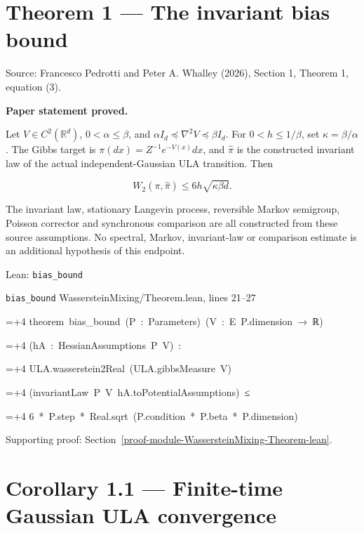 \documentclass[11pt,a4paper]{report}
\newlength{\leancharwidth}
\newenvironment{leancode}{\par\smallskip\begingroup\ttfamily\footnotesize\raggedright
  \settowidth{\leancharwidth}{M}\setlength{\parskip}{0pt}\setlength{\parindent}{0pt}
  \frenchspacing}{\par\endgroup\smallskip}
\newcommand{\leanline}[2]{\hangindent=\dimexpr#1\leancharwidth+4\leancharwidth\relax
  \hangafter=1\noindent\hspace*{#1\leancharwidth}#2\par}
\newcommand{\leansource}[1]{\par{\footnotesize\color{leanmuted}#1}\par}
\begin{document}
\section{\texorpdfstring{Theorem 1 — The invariant bias bound}{Theorem 1 — The invariant bias bound}}


Source: Francesco Pedrotti and Peter A. Whalley (2026), Section 1, Theorem 1, equation (3).



\textbf{Paper statement proved.}



Let \(V\in C^2(\mathbb R^d)\), \(0<\alpha\le\beta\), and
\(\alpha I_d\preccurlyeq\nabla^2V\preccurlyeq\beta I_d\).
For \(0<h\le1/\beta\), set \(\kappa=\beta/\alpha\).
The Gibbs target is \(\pi(dx)=Z^{-1}e^{-V(x)}dx\), and
\(\widehat\pi\) is the constructed invariant law of the actual independent-Gaussian ULA transition. Then


\[W_2(\pi,\widehat\pi)\le6h\sqrt{\kappa\beta d}.\]


The invariant law, stationary Langevin process, reversible Markov semigroup,
Poisson corrector and synchronous comparison are all constructed from these
source assumptions. No spectral, Markov, invariant-law or comparison estimate
is an additional hypothesis of this endpoint.

\begin{leanbox}{Lean: \texttt{bias\_\allowbreak{}bound}}
\leansource{\texttt{bias\_\allowbreak{}bound} \quad WassersteinMixing/\allowbreak{}Theorem.lean, lines 21–27}
\begin{leancode}
\leanline{0}{theorem\ bias\_bound\ (P\ :\ Parameters)\ (V\ :\ E\ P.dimension\ →\ ℝ)}
\leanline{4}{(hA\ :\ HessianAssumptions\ P\ V)\ :}
\leanline{4}{ULA.wasserstein2Real\ (ULA.gibbsMeasure\ V)}
\leanline{6}{(invariantLaw\ P\ V\ hA.toPotentialAssumptions)\ ≤}
\leanline{8}{6\ *\ P.step\ *\ Real.sqrt\ (P.condition\ *\ P.beta\ *\ P.dimension)}
\end{leancode}
\end{leanbox}

{\small\color{gray}Supporting proof: Section~\ref{proof-module-WassersteinMixing-Theorem-lean}.\par}
\section{\texorpdfstring{Corollary 1.1 — Finite-time Gaussian ULA convergence}{Corollary 1.1 — Finite-time Gaussian ULA convergence}}
\end{document}
